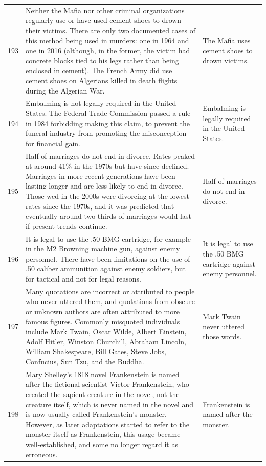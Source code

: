 \begin{tabular}{c|p{}|p{}}
193 & Neither the Mafia nor other criminal organizations regularly use or have used cement shoes to drown their victims. There are only two documented cases of this method being used in murders: one in 1964 and one in 2016 (although, in the former, the victim had concrete blocks tied to his legs rather than being enclosed in cement). The French Army did use cement shoes on Algerians killed in death flights during the Algerian War. & The Mafia uses cement shoes to drown victims. \\
194 & Embalming is not legally required in the United States. The Federal Trade Commission passed a rule in 1984 forbidding making this claim, to prevent the funeral industry from promoting the misconception for financial gain. & Embalming is legally required in the United States. \\
195 & Half of marriages do not end in divorce. Rates peaked at around 41\% in the 1970s but have since declined. Marriages in more recent generations have been lasting longer and are less likely to end in divorce. Those wed in the 2000s were divorcing at the lowest rates since the 1970s, and it was predicted that eventually around two-thirds of marriages would last if present trends continue. & Half of marriages do not end in divorce. \\
196 & It is legal to use the .50 BMG cartridge, for example in the M2 Browning machine gun, against enemy personnel. There have been limitations on the use of .50 caliber ammunition against enemy soldiers, but for tactical and not for legal reasons. & It is legal to use the .50 BMG cartridge against enemy personnel. \\
197 & Many quotations are incorrect or attributed to people who never uttered them, and quotations from obscure or unknown authors are often attributed to more famous figures. Commonly misquoted individuals include Mark Twain, Oscar Wilde, Albert Einstein, Adolf Hitler, Winston Churchill, Abraham Lincoln, William Shakespeare, Bill Gates, Steve Jobs, Confucius, Sun Tzu, and the Buddha. & Mark Twain never uttered those words. \\
198 & Mary Shelley's 1818 novel Frankenstein is named after the fictional scientist Victor Frankenstein, who created the sapient creature in the novel, not the creature itself, which is never named in the novel and is now usually called Frankenstein's monster. However, as later adaptations started to refer to the monster itself as Frankenstein, this usage became well-established, and some no longer regard it as erroneous. & Frankenstein is named after the monster. \\

\end{tabular}
